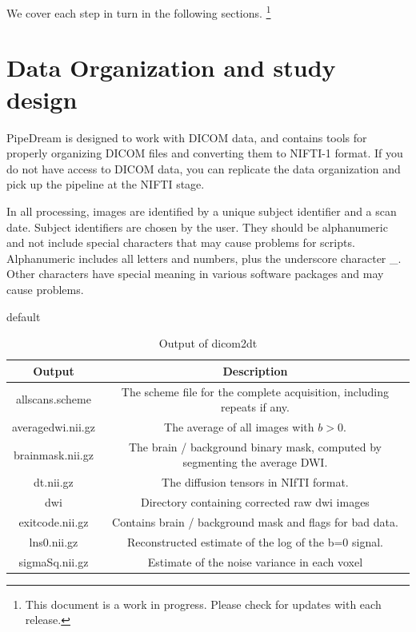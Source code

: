 \documentclass{InsightArticle}
\begin{document}
We cover each step in turn in the following sections. \footnote{This document is a work in progress. Please check for updates with each release.}

\section{Data Organization and study design}

PipeDream is designed to work with DICOM data, and contains tools for properly organizing DICOM files and converting them to NIFTI-1 format. If you do not have access to DICOM data, you can replicate the data organization and pick up the pipeline at the NIFTI stage.

In all processing, images are identified by a unique subject identifier and a scan date. Subject identifiers are chosen by the user. They should be alphanumeric and not include special characters that may cause problems for scripts. Alphanumeric includes all letters and numbers, plus the underscore character \_. Other characters have special meaning in various software packages and may cause problems. 



\begin{table}[htdp]
\caption{default}
\begin{center}
\begin{tabular}{|c|c|}
\hline
\textbf{Output} & \textbf{Description} \\ \hline
allscans.scheme & The scheme file for the complete acquisition, including repeats if any. \\ \hline
averagedwi.nii.gz & The average of all images with $b > 0$. \\ \hline
brainmask.nii.gz & The brain / background binary mask, computed by segmenting the average DWI. \\ \hline
dt.nii.gz         & The diffusion tensors in NIfTI format. \\ \hline
dwi               & Directory containing corrected raw dwi images \\ \hline
exitcode.nii.gz   & Contains brain / background mask and flags for bad data. \\ \hline
lns0.nii.gz       & Reconstructed estimate of the log of the b=0 signal. \\ \hline
sigmaSq.nii.gz    & Estimate of the noise variance in each voxel \\ \hline
\end{tabular}
\end{center}
\label{dicom2dtout}
\caption{Output of dicom2dt}
\end{table}%
\end{document}
